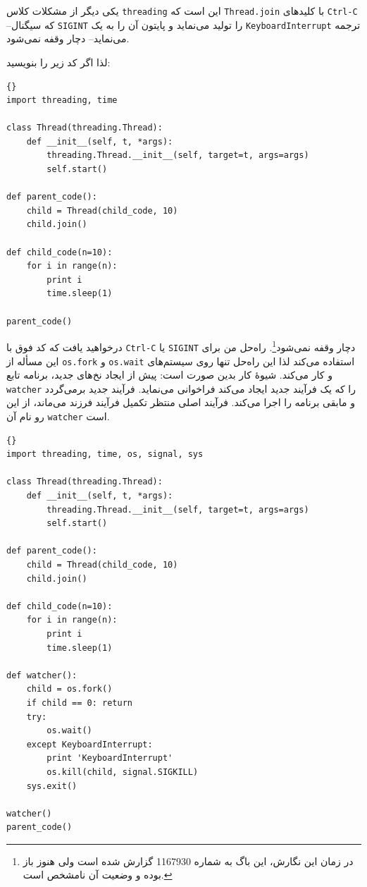 \documentclass{book}
\begin{document}
    یکی دیگر از مشکلات کلاس {\tt threading} این است که {\tt Thread.join} با کلیدهای {\tt Ctrl-C} --که سیگنال  {\tt SIGINT} را تولید می‌نماید 
     و  پایتون آن را به یک {\tt KeyboardInterrupt} ترجمه می‌نماید-- دچار وقفه نمی‌شود. 
    

\newpage
    لذا اگر کد زیر را بنویسید: 

\begin{latin}
\begin{lstlisting}[title=\rl{برنامه توقف‌ناپذیر}]{}
import threading, time

class Thread(threading.Thread):
    def __init__(self, t, *args):
        threading.Thread.__init__(self, target=t, args=args)
        self.start()

def parent_code():
    child = Thread(child_code, 10)
    child.join()

def child_code(n=10):
    for i in range(n):
        print i
        time.sleep(1)
    
parent_code()
\end{lstlisting}
\end{latin}

    درخواهید یافت که کد فوق با {\tt Ctrl-C} یا {\tt SIGINT} دچار وقفه نمی‌شود\footnote{%
    در زمان این نگارش، این باگ به شماره 1167930 گزارش شده است ولی هنوز باز بوده و وضعیت آن نامشخص است.  
    }.
    راه‌حل من برای این مسأله از {\tt os.fork} و {\tt os.wait} استفاده می‌کند لذا این راه‌حل تنها روی سیستم‌های  و  
    کار می‌کند. شیوهٔ کار بدین صورت است:‌ پیش از ایجاد نخ‌های جدید، برنامه  تابع  {\tt watcher} را که یک فرآیند جدید ایجاد می‌کند فراخوانی می‌نماید. 
    فرآیند جدید برمی‌گردد و  مابقی برنامه را اجرا می‌کند. 
    فرآیند اصلی منتظر تکمیل فرآیند فرزند می‌ماند، از این رو نام آن   {\tt watcher} است. 
    

\begin{latin}
\begin{lstlisting}[title={The watcher}]{}
import threading, time, os, signal, sys

class Thread(threading.Thread):
    def __init__(self, t, *args):
        threading.Thread.__init__(self, target=t, args=args)
        self.start()

def parent_code():
    child = Thread(child_code, 10)
    child.join()

def child_code(n=10):
    for i in range(n):
        print i
        time.sleep(1)

def watcher():
    child = os.fork()
    if child == 0: return
    try:
        os.wait()
    except KeyboardInterrupt:
        print 'KeyboardInterrupt'
        os.kill(child, signal.SIGKILL)
    sys.exit()

watcher()
parent_code()
\end{lstlisting}
\end{latin}
\end{document}
